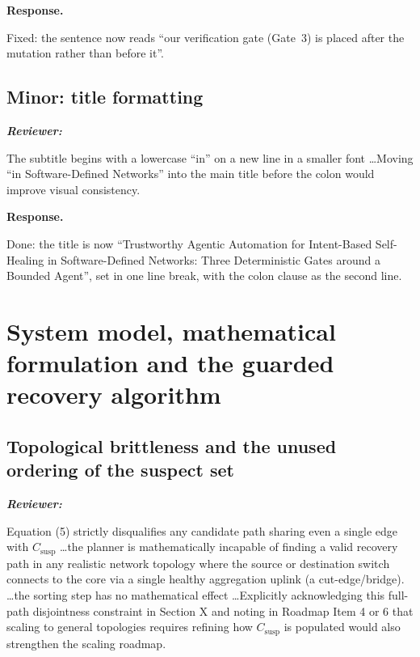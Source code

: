 \documentclass[11pt,a4paper]{article}
\newenvironment{reviewer}{\par\medskip\noindent\begin{minipage}{\linewidth}\small\itshape\color{quote}\textbf{Reviewer:}\par}{\end{minipage}\medskip\par}
\newenvironment{response}{\par\noindent\begin{minipage}{\linewidth}\small\textbf{Response.}\par}{\end{minipage}\medskip\par}
\begin{document}
\begin{response}
Fixed: the sentence now reads ``our verification gate (Gate~3) is placed
after the mutation rather than before it''.
\end{response}

\subsection{Minor: title formatting}

\begin{reviewer}
The subtitle begins with a lowercase ``in'' on a new line in a smaller
font \dots Moving ``in Software-Defined Networks'' into the main title
before the colon would improve visual consistency.
\end{reviewer}

\begin{response}
Done: the title is now ``Trustworthy Agentic Automation for Intent-Based
Self-Healing in Software-Defined Networks: Three Deterministic Gates
around a Bounded Agent'', set in one line break, with the colon clause
as the second line.
\end{response}

\section{System model, mathematical formulation and the guarded recovery
algorithm}

\subsection{Topological brittleness and the unused ordering of the suspect
set}

\begin{reviewer}
Equation (5) strictly disqualifies any candidate path sharing even a
single edge with $C_{\mathrm{susp}}$ \dots the planner is mathematically
incapable of finding a valid recovery path in any realistic network
topology where the source or destination switch connects to the core via a
single healthy aggregation uplink (a cut-edge/bridge). \dots the sorting
step has no mathematical effect \dots Explicitly acknowledging this
full-path disjointness constraint in Section X and noting in Roadmap Item 4
or 6 that scaling to general topologies requires refining how
$C_{\mathrm{susp}}$ is populated would also strengthen the scaling roadmap.
\end{reviewer}
\end{document}
